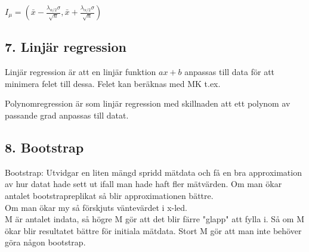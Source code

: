 \documentclass{article}
\begin{document}
$I_{{\mu }}=({\bar  {x}}-{\frac  {\lambda _{{\alpha /2}}\sigma }{{\sqrt
{n}}}},{\bar  {x}}+{\frac  {\lambda _{{\alpha /2}}\sigma }{{\sqrt  {n}}}})$

\subsection*{7. Linjär regression}
Linjär regression är att en linjär funktion $ax+b$ anpassas till data för att
minimera felet till dessa. Felet kan beräknas med MK t.ex.

Polynomregression är som linjär regression med skillnaden att ett polynom av
passande grad anpassas till datat.


\subsection*{8. Bootstrap}
Bootstrap: Utvidgar en liten mängd spridd mätdata och få en bra approximation av
hur datat hade sett ut ifall man hade haft fler mätvärden. Om man ökar antalet
bootstrapreplikat så blir approximationen bättre.
\\Om man ökar my så förskjuts väntevärdet i x-led.
\\M är antalet indata, så högre M gör att det blir färre "glapp" att fylla i. Så
om M ökar blir resultatet bättre för initiala mätdata. Stort M gör att man inte
behöver göra någon bootstrap.
\end{document}
